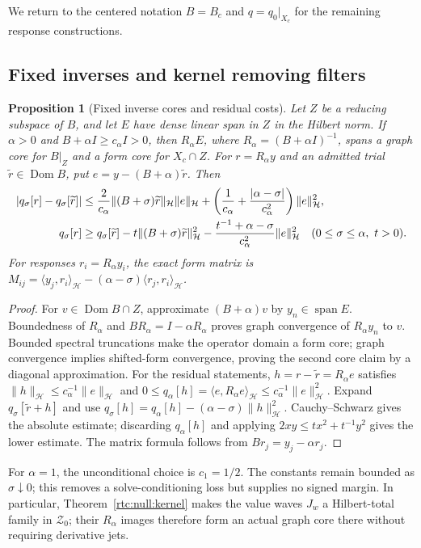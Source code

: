 \documentclass[11pt,a4paper]{article}
\numberwithin{equation}{section}
\newtheorem{proposition}[theorem]{Proposition}
\theoremstyle{definition}\newtheorem{definition}[theorem]{Definition}
\theoremstyle{remark}\newtheorem{remark}[theorem]{Remark}
\newcommand{\Hh}{\mathcal H}\newcommand{\Hw}{\mathcal H}
\newcommand{\ip}[2]{\langle#1,#2\rangle}\newcommand{\norm}[1]{\lVert#1\rVert}\newcommand{\abs}[1]{\lvert#1\rvert}
\begin{document}
We return to the centered notation $B=B_c$ and $q=q_0|_{X_c}$ for
the remaining response constructions.

\subsection{Fixed inverses and kernel removing filters}\label{rtc:sec:cores}
\begin{proposition}[Fixed inverse cores and residual costs]\label{rtc:prop:fixed-core}
Let $Z$ be a reducing subspace of $B$, and let $E$ have dense linear span
in $Z$ in the Hilbert norm. If $\alpha>0$ and
$B+\alpha I\ge c_\alpha I>0$, then
$R_\alpha E$, where $R_\alpha=(B+\alpha I)^{-1}$, spans a graph core
for $B|_Z$ and a form core for $X_c\cap Z$.
For $r=R_\alpha y$ and an admitted trial $\widetilde r\in\operatorname{Dom}B$,
put $e=y-(B+\alpha)\widetilde r$. Then
\begin{align}\label{rtc:eq:fixed-error}
 |q_\sigma[r]-q_\sigma[\widetilde r]|
 &\le {2\over c_\alpha}\norm{(B+\sigma)\widetilde r}_{\Hh}
                 \norm e_{\Hh}
 +\left({1\over c_\alpha}+{|\alpha-\sigma|\over c_\alpha^2}\right)
                 \norm e_{\Hh}^2,\\
 q_\sigma[r]&\ge q_\sigma[\widetilde r]
 -t\norm{(B+\sigma)\widetilde r}_{\Hh}^2
 -{t^{-1}+\alpha-\sigma\over c_\alpha^2}\norm e_{\Hh}^2
 \quad(0\le\sigma\le\alpha,\ t>0).\label{rtc:eq:fixed-lower}
\end{align}
For responses $r_i=R_\alpha y_i$, the exact form matrix is
$M_{ij}=\ip{y_j}{r_i}_{\Hh}-(\alpha-\sigma)\ip{r_j}{r_i}_{\Hh}$.
\end{proposition}
\begin{proof}
For $v\in\operatorname{Dom}B\cap Z$, approximate $(B+\alpha)v$ by
$y_n\in\operatorname{span}E$. Boundedness of $R_\alpha$ and
$BR_\alpha=I-\alpha R_\alpha$ proves graph convergence of $R_\alpha y_n$
to $v$. Bounded spectral truncations make the operator domain a form core;
graph convergence implies shifted-form convergence, proving the second core
claim by a diagonal approximation. For the residual statements,
$h=r-\widetilde r=R_\alpha e$ satisfies
$\norm h_{\Hh}\le c_\alpha^{-1}\norm e_{\Hh}$ and
$0\le q_\alpha[h]=\ip{e}{R_\alpha e}_{\Hh}\le c_\alpha^{-1}\norm e_{\Hh}^2$.
Expand $q_\sigma[\widetilde r+h]$ and use
$q_\sigma[h]=q_\alpha[h]-(\alpha-\sigma)\norm h_{\Hh}^2$.
Cauchy--Schwarz gives the absolute estimate; discarding $q_\alpha[h]$
and applying $2xy\le tx^2+t^{-1}y^2$ gives the lower estimate.
The matrix formula follows from $Br_j=y_j-\alpha r_j$.
\end{proof}
For $\alpha=1$, the unconditional choice is $c_1=1/2$.
The constants remain bounded as $\sigma\downarrow0$; this removes a
solve-conditioning loss but supplies no signed margin.
In particular, Theorem~\ref{rtc:null:kernel} makes the value waves $J_w$
a Hilbert-total family in $\mathcal Z_0$; their $R_\alpha$ images therefore
form an actual graph core there without requiring derivative jets.
\end{document}
